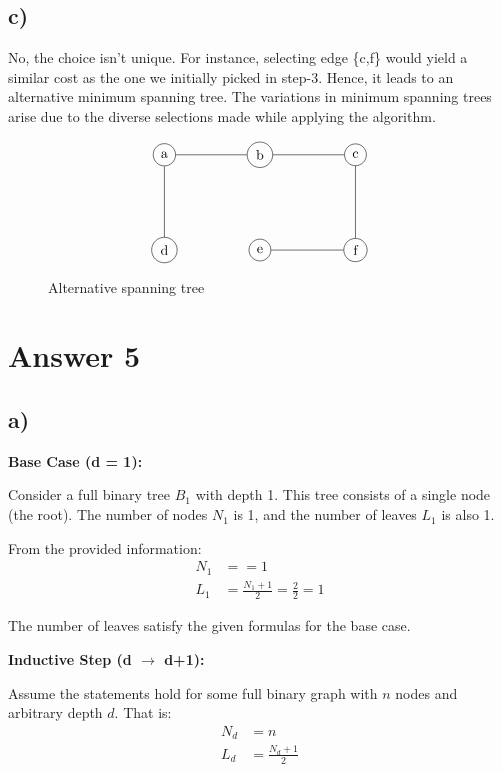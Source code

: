\documentclass[12pt]{article}
\begin{document}
\subsection*{c)}

No, the choice isn't unique. For instance, selecting edge \{c,f\} would yield a similar cost as the one we initially picked in step-3. Hence, it leads to an alternative minimum spanning tree. The variations in minimum spanning trees arise due to the diverse selections made while applying the algorithm.

\begin{figure}[H] 
    \[
\begin{tikzpicture}[scale=0.8]
    \node[circle,draw,] (a) at (-3,0) {a};
    \node[circle,draw,] (b) at (0,0) {b};
    \node[circle,draw,] (c) at (3,0) {c};
    \node[circle,draw,] (d) at (-3,-3) {d};
    \node[circle,draw,](e) at (0,-3) {e};
    \node[circle,draw,] (f) at (3,-3) {f};
    
    \draw (a) -- (b);
    \draw (c) -- (f);
    \draw (e) -- (f);
    \draw (a) -- (d);
    \draw (b) -- (c);
    
\end{tikzpicture}
\]
\caption{Alternative spanning tree}
\end{figure}

\section*{Answer 5}

\subsection*{a)}

\textbf{Base Case (d = 1):}

Consider a full binary tree \( B_1 \) with depth 1. This tree consists of a single node (the root). The number of nodes \( N_1 \) is 1, and the number of leaves \( L_1 \) is also 1.

From the provided information:
\begin{align*}
N_1 &= = 1 \\
L_1 &= \frac{N_1 + 1}{2} = \frac{2}{2} = 1
\end{align*}

The number of leaves satisfy the given formulas for the base case.

\textbf{Inductive Step (d \(\rightarrow\) d+1):}

Assume the statements hold for some full binary graph with \(n\) nodes and arbitrary depth \( d \). That is:
\begin{align*}
N_d &= n \\
L_d &= \frac{N_d + 1}{2}
\end{align*}
\end{document}
